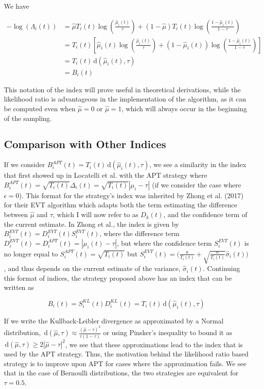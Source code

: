 \documentclass[12pt,]{article}
\newcommand{\der}{\,\text{d}}
\begin{document}
We have

\begin{align*}
-\log(\Lambda_i(t)) & = \hat{\mu}T_i(t) \log(\frac{\hat{\mu}_i(t)}{\tau}) + (1-\hat{\mu})T_i(t) \log(\frac{1-\hat{\mu}_i(t)}{1-\tau}) \\
& = T_i(t) [\hat{\mu}_i(t) \log(\frac{\hat{\mu}_i(t)}{\tau}) + (1-\hat{\mu}_i(t)) \log(\frac{1-\hat{\mu}_i(t)}{1-\tau})] \\
& = T_i(t) \der(\hat{\mu}_i(t), \tau) \\
& = B_i(t)
\end{align*}

This notation of the index will prove useful in theoretical derivations,
while the likelihood ratio is advantageous in the implementation of the
algorithm, as it can be computed even when \(\hat{\mu}=0\) or
\(\hat{\mu}=1\), which will always occur in the beginning of the
sampling.

\subsection{Comparison with Other
Indices}\label{comparison-with-other-indices}

If we consider \(B_i^{APT}(t) = T_i(t) \der(\hat{\mu}_i(t), \tau)\), we
see a similarity in the index that first showed up in Locatelli et al.
with the APT strategy where
\(B^{APT}_i(t) = \sqrt{T_i(t)} \Delta_i(t) = \sqrt{T_i(t)} |\mu_i - \tau|\)
(if we consider the case where \(\epsilon = 0\)). This format for the
strategy's index was inherited by Zhong et al. (2017) for their EVT
algorithm which adapts both the term estimating the difference between
\(\hat{\mu}\) and \(\tau\), which I will now refer to as \(D_k(t)\), and
the confidence term of the current estimate. In Zhong et al., the index
is given by \(B_i^{EVT}(t) = D_i^{EVT}(t)S^{EVT}_i(t)\), where the
difference term \(D_i^{EVT}(t) = D_i^{APT}(t) = |\mu_i(t) - \tau|\), but
where the confidence term \(S_i^{EVT}(t)\) is no longer equal to
\(S_i^{APT}(t)=\sqrt{T_i(t)}\) but
\(S_i^{EVT}(t) = \Big(\frac{a}{T_i(t)} + \sqrt{\frac{a}{T_i(t)}}\hat{\sigma}_i(t)\Big)\),
and thus depends on the current estimate of the variance,
\(\hat{\sigma}_i(t)\). Continuing this format of indices, the strategy
proposed above has an index that can be written as

\[
B_i(t) = S^{KL}_i(t) D_i^{KL}(t) = T_i(t) \der(\hat{\mu}_i(t), \tau)
\]

If we write the Kullback-Leibler divergence as approximated by a Normal
distribution,
\(\der(\hat{\mu}, \tau) \approx \frac{(\hat{\mu}-\tau)^2}{\tau(1-\tau)}\)
or using Pinsker's inequality to bound it as
\(\der(\hat{\mu}, \tau) \geq 2|\hat{\mu}-\tau|^2\), we see that these
approximations lead to the index that is used by the APT strategy. Thus,
the motivation behind the likelihood ratio based strategy is to improve
upon APT for cases where the approximation fails. We see that in the
case of Bernoulli distributions, the two strategies are equivalent for
\(\tau = 0.5\).
\end{document}
